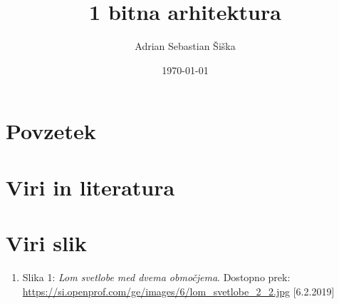 \documentclass[12pt]{article}
\begin{document}
\linespread{1.25}
\title{1 bitna arhitektura}
\author{Adrian Sebastian Šiška}
\date{\today}
\maketitle

\pagebreak

\tableofcontents

\pagebreak

\listoffigures

\pagebreak

\section{Povzetek}

\pagebreak

\section{Viri in literatura}

\section{Viri slik}
\begin{enumerate}
	\item Slika 1: \textit{Lom svetlobe med dvema območjema}. Dostopno prek: \url{https://si.openprof.com/ge/images/6/lom_svetlobe_2_2.jpg} [6.2.2019]
\end{enumerate}
\end{document}
